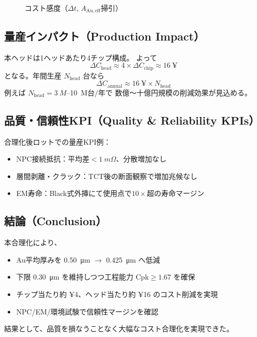 \documentclass[conference]{IEEEtran}
\begin{document}
\begin{figure}[htbp]
  \centering
  \caption{コスト感度（$\Delta t$, $A_{\mathrm{Au,eff}}$掃引）}
  \label{fig:cost-sense}
\end{figure}

\subsection{量産インパクト（Production Impact）}
本ヘッドは1ヘッドあたり4チップ構成。
よって
\[
 \Delta C_{\mathrm{head}} \approx 4 \times \Delta C_{\mathrm{chip}} \approx \SI{16}{¥}
\]
となる。年間生産 $N_{\mathrm{head}}$ 台なら
\[
 \Delta C_{\mathrm{annual}} \approx \SI{16}{¥}\times N_{\mathrm{head}}
\]
例えば $N_{\mathrm{head}}=\SI{3}{M}$--\SI{10}{M}$台/年$で
数億〜十億円規模の削減効果が見込める。

\subsection{品質・信頼性KPI（Quality \& Reliability KPIs）}
合理化後ロットでの量産KPI例：
\begin{itemize}
  \item NPC接続抵抗：平均差$<\SI{1}{m\Omega}$、分散増加なし
  \item 層間剥離・クラック：TCT後の断面観察で増加兆候なし
  \item EM寿命：Black式外挿にて使用点で$10\times$超の寿命マージン
\end{itemize}

\subsection{結論（Conclusion）}
本合理化により、
\begin{itemize}
  \item Au平均厚みを \SI{0.50}{\micro\meter} $\rightarrow$ \SI{0.425}{\micro\meter} へ低減
  \item 下限 \SI{0.30}{\micro\meter} を維持しつつ工程能力 Cpk$\ge1.67$ を確保
  \item チップ当たり約 ¥4、ヘッド当たり約 ¥16 のコスト削減を実現
  \item NPC/EM/環境試験で信頼性マージンを確認
\end{itemize}
結果として、品質を損なうことなく大幅なコスト合理化を実現できた。
\end{document}
